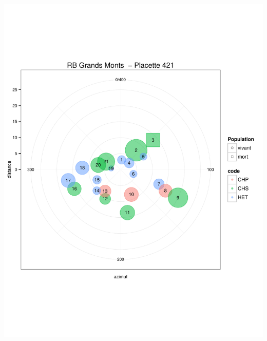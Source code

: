 \documentclass[a4paper]{book}\usepackage[]{graphicx}\usepackage[]{color}
\makeatletter
\def\maxwidth{ %
  \ifdim\Gin@nat@width>\linewidth
    \linewidth
  \else
    \Gin@nat@width
  \fi
}
\newenvironment{knitrout}{}{} %
\makeatother
\begin{document}
\begin{knitrout}
{\centering \includegraphics[width=\maxwidth]{Figures/PlanArbres-37} 

}





\end{knitrout}
\end{document}
